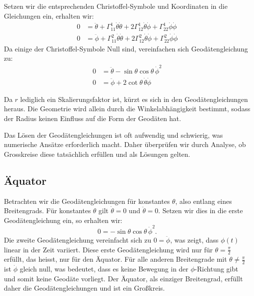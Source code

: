 Setzen wir die entsprechenden Christoffel-Symbole und Koordinaten in die Gleichungen ein, erhalten wir:
\begin{equation}
	\begin{aligned} 
		0 &= \ddot{\theta} + \Gamma^1_{11} \dot{\theta} \dot{\theta} + 2\Gamma^1_{12} \dot{\theta}\dot{\phi} + \Gamma^1_{22} \dot{\phi} \dot{\phi} \\
		0 &= \ddot{\phi} + \Gamma^2_{11} \dot{\theta} \dot{\theta} + 2\Gamma^2_{12} \dot{\theta}\dot{\phi} + \Gamma^2_{22} \dot{\phi} \dot{\phi}
	\end{aligned}
\end{equation}
Da einige der Christoffel-Symbole Null sind, vereinfachen sich Geodätengleichung zu:
\begin{align}
	0 &= \ddot{\theta} - \sin\theta \cos\theta \, \dot{\phi}^2 \\
	0 &= \ddot{\phi} + 2 \cot\theta \, \dot{\theta} \dot{\phi}
\end{align}

Da $r$ lediglich ein Skalierungsfaktor ist, kürzt es sich in den Geodätengleichungen heraus. 
Die Geometrie wird allein durch die Winkelabhängigkeit bestimmt, sodass der Radius keinen Einfluss auf die Form der Geodäten hat.

Das Lösen der Geodätengleichungen ist oft aufwendig und schwierig, was numerische Ansätze erforderlich macht. 
Daher überprüfen wir durch Analyse, ob Grosskreise diese tatsächlich erfüllen und als Lösungen gelten.

\subsection{Äquator}
Betrachten wir die Geodätengleichungen für konstantes $\theta$, also entlang eines Breitengrads.
Für konstantes $\theta$ gilt $\dot{\theta} = 0$ und $\ddot{\theta} = 0$.
Setzen wir dies in die erste Geodätengleichung ein, so erhalten wir:
\begin{equation}
	0 = -\sin\theta \cos\theta \, \dot{\phi}^2.
\end{equation}
Die zweite Geodätengleichung vereinfacht sich zu $0 = \ddot{\phi}$, was zeigt, dass $\phi(t)$ linear in der Zeit variiert.
Diese erste Geodätengleichung wird nur für $\theta = \frac{\pi}{2}$ erfüllt, das heisst, nur für den Äquator.
Für alle anderen Breitengrade mit $\theta \neq \frac{\pi}{2}$ ist $\dot{\phi}$ gleich null, was bedeutet, dass es keine Bewegung in der $\phi$-Richtung gibt und somit keine Geodäte vorliegt.
Der Äquator, als einziger Breitengrad, erfüllt daher die Geodätengleichungen und ist ein Großkreis.

